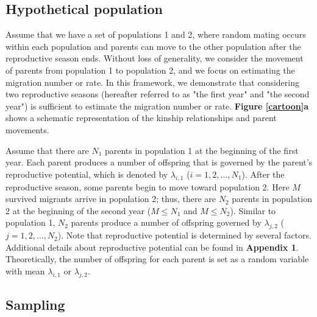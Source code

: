 \documentclass[12pt, English]{article}
\begin{document}
\begin{spacing}{1.9}
\subsection{Hypothetical population}

Assume that we have a set of populations 1 and 2, where random mating occurs within each population and parents can move to the other population after the reproductive season ends. Without loss of generality, we consider the movement of parents from population 1 to population 2, and we focus on estimating the migration number or rate. In this framework, we demonstrate that considering two reproductive seasons (hereafter referred to as "the first year" and "the second year") is sufficient to estimate the migration number or rate. {\bf Figure \ref{cartoon}a} shows a schematic representation of the kinship relationships and parent movements. 

Assume that there are $N_1$ parents in population 1 at the beginning of the first year. Each parent produces a number of offspring that is governed by the parent's reproductive potential, which is denoted by $\lambda_{i,1}$ ($i=1,2,\ldots,N_1$). After the reproductive season, some parents begin to move toward population 2. Here $M$ survived migrants arrive in population 2; thus, there are $N_2$ parents in population 2 at the beginning of the second year ($M \le N_1$ and $M \le N_2$). Similar to population 1, $N_2$ parents produce a number of offspring governed by $\lambda_{j,2}$ ($j=1,2,\ldots,N_2$). Note that reproductive potential is determined by several factors. Additional details about reproductive potential can be found in {\bf Appendix 1}. Theoretically, the number of offspring for each parent is set as a random variable with mean $\lambda_{i,1}$ or $\lambda_{j,2}$. 

\begin{center}
\end{center}

\subsection{Sampling}


\end{spacing}
\end{document}
